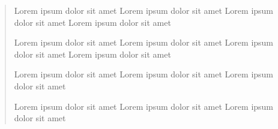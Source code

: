 \begin{verse}
Lorem ipsum dolor sit amet\br
Lorem ipsum dolor sit amet\br
Lorem ipsum dolor sit amet\br
Lorem ipsum dolor sit amet

Lorem ipsum dolor sit amet\br
Lorem ipsum dolor sit amet\br
Lorem ipsum dolor sit amet\br
Lorem ipsum dolor sit amet

Lorem ipsum dolor sit amet\br
Lorem ipsum dolor sit amet\br
Lorem ipsum dolor sit amet

Lorem ipsum dolor sit amet\br
Lorem ipsum dolor sit amet\br
Lorem ipsum dolor sit amet
\end{verse}

